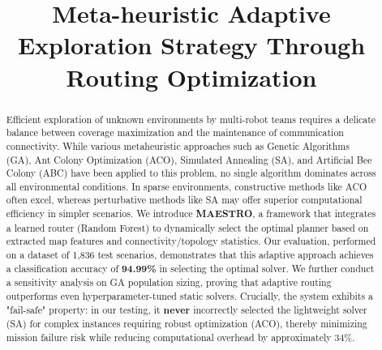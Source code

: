 \documentclass[conference]{IEEEtran}
\newcommand{\systemname}{MAESTRO}
\begin{document}
\title{Meta-heuristic Adaptive Exploration Strategy Through Routing Optimization}


\author{
}

\maketitle

\begin{abstract}
Efficient exploration of unknown environments by multi-robot teams requires a delicate balance between coverage maximization and the maintenance of communication connectivity. While various metaheuristic approaches such as Genetic Algorithms (GA), Ant Colony Optimization (ACO), Simulated Annealing (SA), and Artificial Bee Colony (ABC) have been applied to this problem, no single algorithm dominates across all environmental conditions. In sparse environments, constructive methods like ACO often excel, whereas perturbative methods like SA may offer superior computational efficiency in simpler scenarios. We introduce \textbf{\systemname{}}, a framework that integrates a learned router (Random Forest) to dynamically select the optimal planner based on extracted map features and connectivity/topology statistics. Our evaluation, performed on a dataset of 1,836 test scenarios, demonstrates that this adaptive approach achieves a classification accuracy of \textbf{94.99\%} in selecting the optimal solver. We further conduct a sensitivity analysis on GA population sizing, proving that adaptive routing outperforms even hyperparameter-tuned static solvers. Crucially, the system exhibits a "fail-safe" property: in our testing, it \textbf{never} incorrectly selected the lightweight solver (SA) for complex instances requiring robust optimization (ACO), thereby minimizing mission failure risk while reducing computational overhead by approximately 34\%.
\end{abstract}
\end{document}

